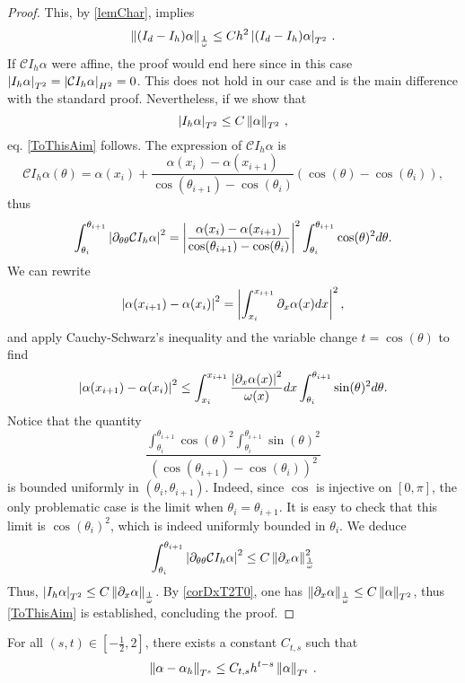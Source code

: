 \documentclass[a4paper]{article}
\begin{document}
\begin{proof}
	This, by \autoref{lemChar}, implies 
	\[\left\|(I_d - I_h)\alpha\right\|_{\frac{1}{\omega}} \leq Ch^2 \left\lvert (I_d - I_h)\alpha \right\rvert_{T^2}\,.\]
	If $\mathcal{C}I_h \alpha$ were affine, the proof would end here since in this case $\left\lvert I_h \alpha \right\rvert_{T^2} = \left\lvert \mathcal{C}I_h \alpha \right\rvert_{H^2} = 0$. This does not hold in our case and is the main difference with the standard proof. Nevertheless, if we show that 
	\[\left\lvert I_h \alpha \right\rvert_{T^2} \leq C \left\|\alpha\right\|_{T^2}\,,\]
	eq. \eqref{ToThisAim} follows. The expression of $\mathcal{C}I_h \alpha$ is 
	\[\mathcal{C}{I_h \alpha}(\theta) = \alpha(x_i) + \frac{\alpha(x_i) - \alpha(x_{i+1})}{\cos(\theta_{i+1}) - \cos(\theta_i)} (\cos(\theta) - \cos(\theta_i)),\]
	thus
	\[\int_{\theta_i}^{\theta_{i+1}} \left\lvert \partial_{\theta\theta}\mathcal{C}{I_h\alpha} \right\rvert^2 = \left\lvert \frac{\alpha(x_i) - \alpha(x_{i+1})}{\cos(\theta_{i+1}) - \cos(\theta_i)} \right\rvert^2 \int_{\theta_i}^{\theta_{i+1}} \cos(\theta)^2 d\theta.\]
	We can rewrite 
	\[\left\lvert \alpha(x_{i+1}) - \alpha(x_i) \right\rvert^2 = \left\lvert  \int_{x_i}^{x_{i+1}} \partial_x\alpha(x)dx \right\rvert^2,\]
	and apply Cauchy-Schwarz's inequality and the variable change $t = \cos(\theta)$ to find 
	\[\left\lvert \alpha(x_{i+1}) - \alpha(x_i) \right\rvert^2 \leq \int_{x_i}^{x_{i+1}} \frac{\left\lvert \partial_x \alpha(x) \right\rvert^2}{\omega(x)} dx\int_{\theta_i}^{\theta_{i+1}} \sin(\theta)^2 d\theta.\]
	Notice that the quantity
	\[\frac{ \int_{\theta_i}^{\theta_{i+1}} \cos(\theta)^2\int_{\theta_i}^{\theta_{i+1}} \sin(\theta)^2}{(\cos(\theta_{i+1}) - \cos(\theta_i))^2}\]
	is bounded uniformly in $(\theta_i, \theta_{i+1})$. Indeed, since $\cos$ is injective on $[0,\pi]$, the only problematic case is the limit when $\theta_i = \theta_{i+1}$. It is easy to check that this limit is $\cos(\theta_i)^2$, which is indeed uniformly bounded in $\theta_i$. We deduce 
	\[ \int_{\theta_i}^{\theta_{i+1}} \left\lvert \partial_{\theta\theta}\mathcal{C}{I_h\alpha} \right\rvert^2 \leq C \left\|\partial_x \alpha\right\|^2_\frac{1}{\omega}\]
	Thus, $\left\lvert I_h \alpha \right\rvert_{T^2} \leq C \left\|\partial_x \alpha\right\|_{\frac{1}{\omega}}$. By \autoref{corDxT2T0}, one has $\left\|\partial_x \alpha\right\|_{\frac{1}{\omega}} \leq C \left\|\alpha\right\|_{T^2}$, thus \eqref{ToThisAim} is established, concluding the proof.	
	\end{proof} 
	\begin{Cor}
		For all $(s,t) \in [-\frac{1}{2}, 2]$, there exists a constant $C_{t,s}$ such that
		\[\left\|\alpha - \alpha_h\right\|_{T^s} \leq C_{t,s} h^{t - s} \left\|\alpha\right\|_{T^t}\,. \]
	\end{Cor}
\end{document}
